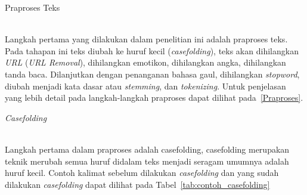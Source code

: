 \begin{enumerate}
  {\bfseries \item Praproses Teks}\\
  Langkah pertama yang dilakukan dalam penelitian ini adalah praproses teks. Pada tahapan ini teks
  diubah ke huruf kecil (\emph{casefolding}), teks akan dihilangkan \emph{URL} (\emph{URL Removal}),
  dihilangkan emotikon, dihilangkan angka, dihilangkan tanda baca. Dilanjutkan dengan penanganan
  bahasa gaul, dihilangkan \emph{stopword}, diubah menjadi kata dasar atau \emph{stemming}, dan \emph{tokenizing}.
  Untuk penjelasan yang lebih detail pada langkah-langkah praproses dapat dilihat pada~\autoref{Praproses}.

  \begin{enumerate}
    {\bfseries \item \emph{Casefolding}}\\
    Langkah pertama dalam praproses adalah casefolding, casefolding merupakan teknik merubah semua
    huruf didalam teks menjadi seragam umumnya adalah huruf kecil. Contoh kalimat sebelum dilakukan
    \emph{casefolding} dan yang sudah dilakukan \emph{casefolding} dapat dilihat pada Tabel~\ref{tab:contoh_casefolding}


\end{enumerate}
\end{enumerate}
